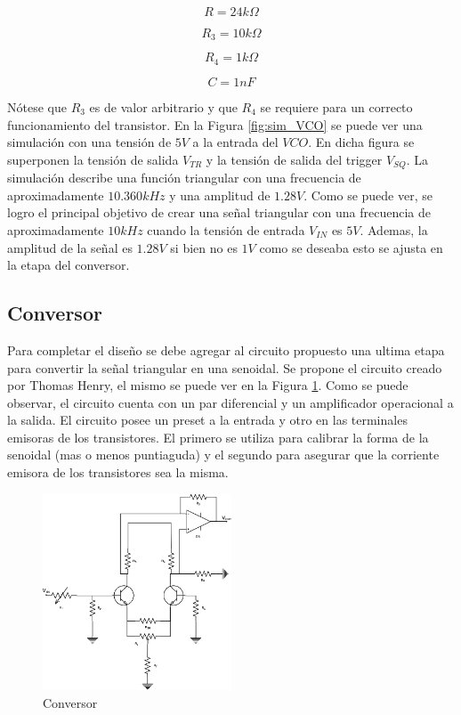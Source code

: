 \begin{displaymath}
    R = 24k \Omega
\end{displaymath}

\begin{displaymath}
    R_3 = 10k \Omega
\end{displaymath}

\begin{displaymath}
    R_4 = 1k \Omega
\end{displaymath}

\begin{displaymath}
    C = 1nF
\end{displaymath}

Nótese que $R_3$ es de valor arbitrario y que $R_4$ se requiere para un correcto funcionamiento del transistor. En la Figura \ref{fig:sim_VCO} se puede ver una simulación con una tensión de $5V$ a la entrada del $VCO$. En dicha figura se superponen la tensión de salida $V_{TR}$ y la tensión de salida del trigger $V_{SQ}$. La simulación describe una función triangular con una frecuencia de aproximadamente $10.360 kHz$ y una amplitud de $1.28V$. Como se puede ver, se logro el principal objetivo de crear una señal triangular con una frecuencia de aproximadamente $10 kHz$ cuando la tensión de entrada $V_{IN}$ es $5V$. Ademas, la amplitud de la señal es $1.28 V$ si bien no es $1V$ como se deseaba esto se ajusta en la etapa del conversor. 

\subsection{Conversor}
Para completar el diseño se debe agregar al circuito propuesto una ultima etapa para convertir la señal triangular en una senoidal. Se propone el circuito creado por Thomas Henry, el mismo se puede ver en la Figura \ref{fig:conversor}. Como se puede observar, el circuito cuenta con un par diferencial y un amplificador operacional a la salida. El circuito posee un preset a la entrada y otro en las terminales emisoras de los transistores. El primero se utiliza para calibrar la forma de la senoidal (mas o menos puntiaguda) y el segundo para asegurar que la corriente emisora de los transistores sea la misma. 


\begin{figure}[h!]                                                       
    \centering\includegraphics[width=0.5\textwidth]{../Ex3/Resources/conversor.png}
    \caption{Conversor}
    \label{fig:conversor}
    \end{figure}

